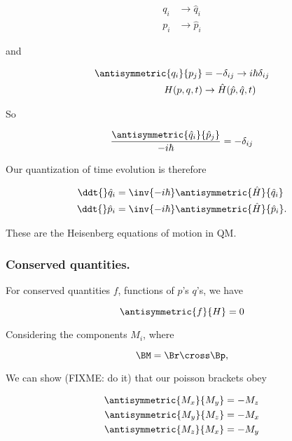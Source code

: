 \begin{align}\label{eqn:phaseSpaceAndTrajectories:n}
q_i &\rightarrow \hat{q}_i \\
p_i &\rightarrow \hat{p}_i
\end{align}

and

\begin{align}\label{eqn:phaseSpaceAndTrajectories:n}
\antisymmetric{q_i}{p_j} &= -\delta_{ij} \rightarrow i \hbar \delta_{ij} \\
H(p, q, t) &\rightarrow \hat{H}(\hat{p}, \hat{q}, t)
\end{align}

So 

\begin{equation}\label{eqn:phaseSpaceAndTrajectories:n}
\frac{\antisymmetric{\hat{q}_i}{\hat{p}_j}}{-i \hbar } = - \delta_{ij}
\end{equation}

Our quantization of time evolution is therefore

\begin{align}\label{eqn:phaseSpaceAndTrajectories:n}
\ddt{} \hat{q}_i &= \inv{-i\hbar} \antisymmetric{\hat{H}}{\hat{q}_i} \\
\ddt{} \hat{p}_i &= \inv{-i\hbar} \antisymmetric{\hat{H}}{\hat{p}_i}.
\end{align}

These are the Heisenberg equations of motion in QM.

\subsubsection{Conserved quantities.}

For conserved quantities $f$, functions of $p$'s $q$'s, we have

\begin{equation}\label{eqn:phaseSpaceAndTrajectories:n}
\antisymmetric{f}{H} = 0
\end{equation}

Considering the components $M_i$, where 

\begin{equation}\label{eqn:phaseSpaceAndTrajectories:n}
\BM = \Br \cross \Bp,
\end{equation}

We can show (FIXME: do it) that our poisson brackets obey

\begin{align}\label{eqn:phaseSpaceAndTrajectories:n}
\antisymmetric{M_x}{M_y} &= -M_z \\
\antisymmetric{M_y}{M_z} &= -M_x \\
\antisymmetric{M_z}{M_x} &= -M_y
\end{align}

